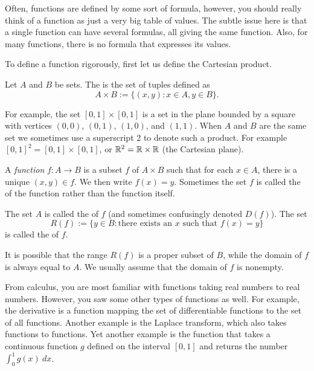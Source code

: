 Often, functions are defined by some sort of
formula, however, you should really think of a function as just a very big
table of values.
The subtle issue here is that a single function can have several 
formulas, all giving the same function.  Also, for many functions, there is
no formula that expresses its values.

To define a function rigorously, first let us define the Cartesian product.

\begin{defn}
Let $A$ and $B$ be sets.  The \emph{}
is the set of tuples defined as
\begin{equation*}
A \times B :=
\{ (x,y) : x \in A, y \in B \} .
\end{equation*}
\end{defn}

For example, the set $[0,1] \times [0,1]$ is a set in the plane
bounded by a square with vertices $(0,0)$, $(0,1)$, $(1,0)$, and $(1,1)$.
When $A$ and $B$ are the same set we sometimes use a superscript 2 to denote
such a product.  For example $[0,1]^2 = 
[0,1] \times [0,1]$, or ${\mathbb{R}}^2 = {\mathbb{R}} \times {\mathbb{R}}$ (the Cartesian plane).

\begin{defn}
A \emph{function} $f \colon A \to B$ is a subset $f$ of $A \times B$
such that for each $x \in A$, there is a unique $(x,y) \in f$.  We then
write $f(x) = y$.  Sometimes
the set $f$ is called the \emph{} of the function rather than
the function itself.

The set $A$ is called the \emph{} of $f$ (and
sometimes confusingly denoted $D(f)$).  The set
\begin{equation*}
R(f) := \{ y \in B : \text{there exists an } x \text{ such that }
f(x)=y \}
\end{equation*}
is called the \emph{} of $f$.
\end{defn}

It is possible that the range $R(f)$ is a proper subset of $B$,
while the domain of $f$ is always equal to $A$.  We usually 
assume that the domain of $f$ is nonempty.

\begin{example}
From calculus, you are most familiar with functions taking real numbers to real
numbers.  However, you saw some other types of functions as well.  For
example, the derivative is a function mapping the set of
differentiable functions to the set of all functions.
Another example is the Laplace transform, which also
takes functions to functions.  Yet another example is the function that takes
a continuous function $g$ defined on the interval $[0,1]$ and returns the
number $\int_0^1 g(x) ~dx$.
\end{example}

